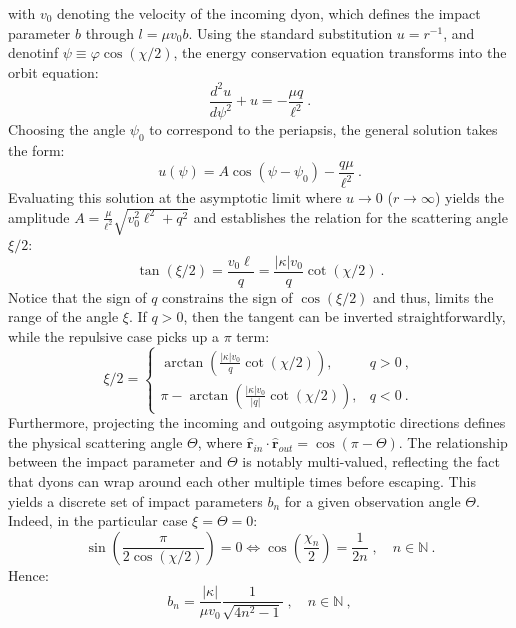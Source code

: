 \documentclass[a4paper,11pt]{article}
\begin{document}
with $v_0$ denoting the velocity of the incoming dyon, which defines the impact parameter $b$ through $l = \mu v_0 b$. Using the standard substitution $u = r^{-1}$, and denotinf $\psi\equiv \varphi \cos(\chi/2)$, the energy conservation equation transforms into the orbit equation:
\begin{equation}
    \frac{d^2 u}{d\psi^2} + u = -\frac{\mu q}{\ell^2}\ .
\end{equation}
Choosing the angle $\psi_0$ to correspond to the periapsis, the general solution takes the form:
\begin{equation}
    u(\psi) = A\cos(\psi - \psi_0) - \frac{q\mu}{\ell^2}\ .
\end{equation}
Evaluating this solution at the asymptotic limit where $u \to 0$ ($r \to \infty$) yields the amplitude $A = \frac{\mu}{\ell^2}\sqrt{v_0^2 \ell^2 + q^2}$ and establishes the relation for the scattering angle $\xi/2$:
\begin{equation}
    \tan(\xi/2) = \frac{v_0 \ell}{q}= \frac{|\kappa| v_0}{q} \cot(\chi/2)\ .
\end{equation}
Notice that the sign of $q$ constrains the sign of $\cos(\xi/2)$ and thus, limits the range of the angle $\xi$. If $q > 0$, then the tangent can be inverted straightforwardly, while the repulsive case picks up a $\pi$ term:
\begin{equation}
    \xi/2 = \begin{cases} \arctan\left(\frac{|\kappa|v_0}{q} \cot(\chi/2)\right), & q > 0\ , \\ \pi - \arctan\left(\frac{|\kappa|v_0}{|q|} \cot(\chi/2)\right), & q < 0 \ . \end{cases}
\end{equation}
Furthermore, projecting the incoming and outgoing asymptotic directions defines the physical scattering angle $\Theta$, where $\hat{\boldsymbol{r}}_{in} \cdot \hat{\boldsymbol{r}}_{out} = \cos(\pi - \Theta)$. The relationship between the impact parameter and $\Theta$ is notably multi-valued, reflecting the fact that dyons can wrap around each other multiple times before escaping. This yields a discrete set of impact parameters $b_n$ for a given observation angle $\Theta$. Indeed, in the particular case $\xi=\Theta=0$:
\begin{equation}
    \sin\left(\frac{\pi}{2\cos(\chi/2)}\right) = 0 \iff \cos\left(\frac{\chi_n}{2}\right) = \frac{1}{2n} \; , \quad n \in \mathbb{N}\ .
\end{equation}
Hence:
\begin{equation}
    b_n = \frac{|\kappa|}{\mu v_0}\frac{1}{\sqrt{4n^2 - 1}} \; , \quad n \in \mathbb{N}\ ,
\end{equation}
\end{document}
